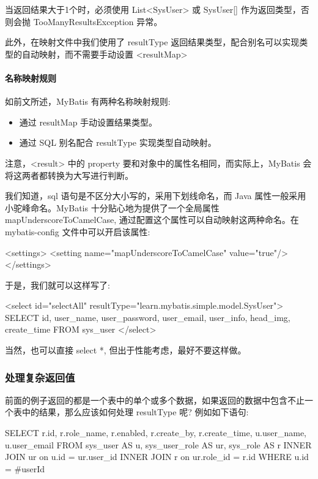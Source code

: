 当返回结果大于1个时，必须使用 List<SysUser> 或 SysUser[] 作为返回类型，否则会抛 TooManyResultsException 异常。 

此外，在映射文件中我们使用了 resultType 返回结果类型，配合别名可以实现类型的自动映射，而不需要手动设置 <resultMap>

\paragraph*{名称映射规则} 如前文所述，MyBatis 有两种名称映射规则:
\begin{itemize}
    \item 通过 resultMap 手动设置结果类型。
    \item 通过 SQL 别名配合 resultType 实现类型自动映射。
\end{itemize}

注意，<result> 中的 property 要和对象中的属性名相同，而实际上，MyBatis 会将这两者都转换为大写进行判断。

我们知道，sql 语句是不区分大小写的，采用下划线命名，而 Java 属性一般采用小驼峰命名。MyBatis 十分贴心地为提供了一个全局属性 mapUnderscoreToCamelCase, 通过配置这个属性可以自动映射这两种命名。在 mybatis-config 文件中可以开启该属性:

\begin{xml}
<settings>
    <setting name="mapUnderscoreToCamelCase" value="true"/>
</settings>
\end{xml}

于是，我们就可以这样写了:
\begin{xml}
<select id="selectAll" resultType="learn.mybatis.simple.model.SysUser">
    SELECT id, user_name, user_password, user_email, user_info, head_img, create_time
    FROM sys_user
</select>
\end{xml}

当然，也可以直接 select *, 但出于性能考虑，最好不要这样做。

\subsubsection*{处理复杂返回值}

前面的例子返回的都是一个表中的单个或多个数据，如果返回的数据中包含不止一个表中的结果，那么应该如何处理 resultType 呢? 例如如下语句:

\begin{sql}
SELECT r.id, r.role_name, r.enabled, r.create_by, r.create_time, u.user_name, u.user_email
FROM sys_user AS u,
     sys_user_role AS ur,
     sys_role AS r
         INNER JOIN ur on u.id = ur.user_id
         INNER JOIN r on ur.role_id = r.id
WHERE u.id = #{userId}
\end{sql}

